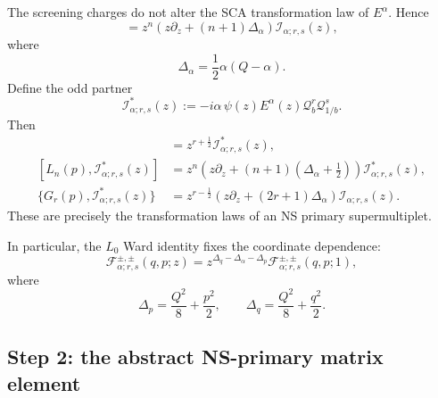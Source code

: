 \documentclass[11pt]{article}
\begin{document}
The screening charges do not alter the SCA transformation law of
\(E^\alpha\).  Hence
\begin{equation}
 [L_n(p),\mathcal I_{\alpha;r,s}(z)]
 =
 z^n\left(
 z\partial_z+(n+1)\Delta_\alpha
 \right)\mathcal I_{\alpha;r,s}(z),
 \label{eq:screened-L-transformation}
\end{equation}
where
\begin{equation}
 \Delta_\alpha=\frac12\alpha(Q-\alpha).
 \label{eq:abstract-primary-weight}
\end{equation}
Define the odd partner
\begin{equation}
 \mathcal I_{\alpha;r,s}^{*}(z)
 :=
 -i\alpha\,
 \psi(z)E^\alpha(z)
 \mathcal Q_b^r\mathcal Q_{1/b}^s.
 \label{eq:screened-odd-partner}
\end{equation}
Then
\begin{align}
 [G_r(p),\mathcal I_{\alpha;r,s}(z)]
 &=
 z^{r+\frac12}\mathcal I_{\alpha;r,s}^{*}(z),
 \label{eq:screened-G-transformation}
 \\
 [L_n(p),\mathcal I_{\alpha;r,s}^{*}(z)]
 &=
 z^n\left(
 z\partial_z+(n+1)\left(\Delta_\alpha+\frac12\right)
 \right)\mathcal I_{\alpha;r,s}^{*}(z),
 \label{eq:screened-star-L-transformation}
 \\
 \{G_r(p),\mathcal I_{\alpha;r,s}^{*}(z)\}
 &=
 z^{r-\frac12}
 \left(
 z\partial_z+(2r+1)\Delta_\alpha
 \right)\mathcal I_{\alpha;r,s}(z).
 \label{eq:screened-star-G-transformation}
\end{align}
These are precisely the transformation laws of an NS primary
supermultiplet.

In particular, the \(L_0\) Ward identity fixes the coordinate dependence:
\begin{equation}
 \mathcal F_{\alpha;r,s}^{\pm,\pm}(q,p;z)
 =
 z^{\Delta_q-\Delta_\alpha-\Delta_p}
 \mathcal F_{\alpha;r,s}^{\pm,\pm}(q,p;1),
 \label{eq:free-field-primary-z-dependence}
\end{equation}
where
\begin{equation}
 \Delta_p=\frac{Q^2}{8}+\frac{p^2}{2},
 \qquad
 \Delta_q=\frac{Q^2}{8}+\frac{q^2}{2}.
 \label{eq:p-and-q-weights}
\end{equation}

\subsection{Step 2: the abstract NS-primary matrix element}
\end{document}
